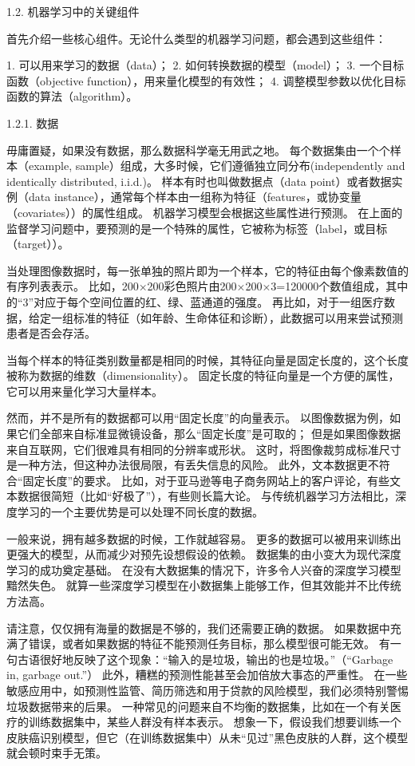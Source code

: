  1.2. 机器学习中的关键组件

首先介绍一些核心组件。无论什么类型的机器学习问题，都会遇到这些组件：

1. 可以用来学习的数据（data）；
2. 如何转换数据的模型（model）；
3. 一个目标函数（objective function），用来量化模型的有效性；
4. 调整模型参数以优化目标函数的算法（algorithm）。

 1.2.1. 数据

毋庸置疑，如果没有数据，那么数据科学毫无用武之地。 每个数据集由一个个样本（example, sample）组成，大多时候，它们遵循独立同分布(independently and identically distributed, i.i.d.)。 样本有时也叫做数据点（data point）或者数据实例（data instance），通常每个样本由一组称为特征（features，或协变量（covariates））的属性组成。 机器学习模型会根据这些属性进行预测。 在上面的监督学习问题中，要预测的是一个特殊的属性，它被称为标签（label，或目标（target））。

当处理图像数据时，每一张单独的照片即为一个样本，它的特征由每个像素数值的有序列表表示。 比如，200×200彩色照片由200×200×3=120000个数值组成，其中的“3”对应于每个空间位置的红、绿、蓝通道的强度。 再比如，对于一组医疗数据，给定一组标准的特征（如年龄、生命体征和诊断），此数据可以用来尝试预测患者是否会存活。

当每个样本的特征类别数量都是相同的时候，其特征向量是固定长度的，这个长度被称为数据的维数（dimensionality）。 固定长度的特征向量是一个方便的属性，它可以用来量化学习大量样本。

然而，并不是所有的数据都可以用“固定长度”的向量表示。 以图像数据为例，如果它们全部来自标准显微镜设备，那么“固定长度”是可取的； 但是如果图像数据来自互联网，它们很难具有相同的分辨率或形状。 这时，将图像裁剪成标准尺寸是一种方法，但这种办法很局限，有丢失信息的风险。 此外，文本数据更不符合“固定长度”的要求。 比如，对于亚马逊等电子商务网站上的客户评论，有些文本数据很简短（比如“好极了”），有些则长篇大论。 与传统机器学习方法相比，深度学习的一个主要优势是可以处理不同长度的数据。

一般来说，拥有越多数据的时候，工作就越容易。 更多的数据可以被用来训练出更强大的模型，从而减少对预先设想假设的依赖。 数据集的由小变大为现代深度学习的成功奠定基础。 在没有大数据集的情况下，许多令人兴奋的深度学习模型黯然失色。 就算一些深度学习模型在小数据集上能够工作，但其效能并不比传统方法高。

请注意，仅仅拥有海量的数据是不够的，我们还需要正确的数据。 如果数据中充满了错误，或者如果数据的特征不能预测任务目标，那么模型很可能无效。 有一句古语很好地反映了这个现象：“输入的是垃圾，输出的也是垃圾。”（“Garbage in, garbage out.”） 此外，糟糕的预测性能甚至会加倍放大事态的严重性。 在一些敏感应用中，如预测性监管、简历筛选和用于贷款的风险模型，我们必须特别警惕垃圾数据带来的后果。 一种常见的问题来自不均衡的数据集，比如在一个有关医疗的训练数据集中，某些人群没有样本表示。 想象一下，假设我们想要训练一个皮肤癌识别模型，但它（在训练数据集中）从未“见过”黑色皮肤的人群，这个模型就会顿时束手无策。


